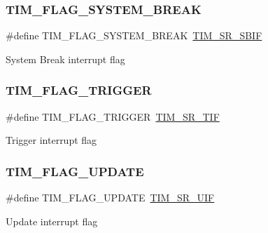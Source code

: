 \subsubsection{\texorpdfstring{TIM\_FLAG\_SYSTEM\_BREAK}{TIM\_FLAG\_SYSTEM\_BREAK}}
{\footnotesize\ttfamily \#define T\+I\+M\+\_\+\+F\+L\+A\+G\+\_\+\+S\+Y\+S\+T\+E\+M\+\_\+\+B\+R\+E\+AK~\mbox{\hyperlink{group___peripheral___registers___bits___definition_gae6c84655ac31844ff644f796ef638e06}{T\+I\+M\+\_\+\+S\+R\+\_\+\+S\+B\+IF}}}

System Break interrupt flag \mbox{\label{group___t_i_m___flag__definition_gacacf94fcf8b5ee4287f2d5a56dce91b7}} 
\subsubsection{\texorpdfstring{TIM\_FLAG\_TRIGGER}{TIM\_FLAG\_TRIGGER}}
{\footnotesize\ttfamily \#define T\+I\+M\+\_\+\+F\+L\+A\+G\+\_\+\+T\+R\+I\+G\+G\+ER~\mbox{\hyperlink{group___peripheral___registers___bits___definition_ga7c8b16f3ced6ec03e9001276b134846e}{T\+I\+M\+\_\+\+S\+R\+\_\+\+T\+IF}}}

Trigger interrupt flag \mbox{\label{group___t_i_m___flag__definition_gac45ce66cf33b4f324323fc3036917712}} 
\subsubsection{\texorpdfstring{TIM\_FLAG\_UPDATE}{TIM\_FLAG\_UPDATE}}
{\footnotesize\ttfamily \#define T\+I\+M\+\_\+\+F\+L\+A\+G\+\_\+\+U\+P\+D\+A\+TE~\mbox{\hyperlink{group___peripheral___registers___bits___definition_gac8c03fabc10654d2a3f76ea40fcdbde6}{T\+I\+M\+\_\+\+S\+R\+\_\+\+U\+IF}}}

Update interrupt flag 